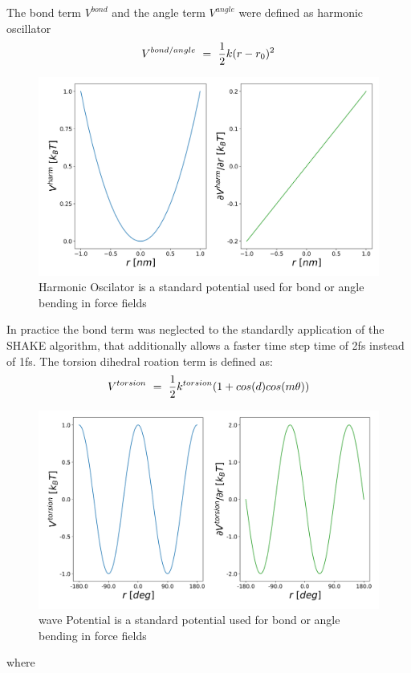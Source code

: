 The bond term  $V^{bond}$ and the angle term $V^{angle}$ were defined as harmonic oscillator \cite{}
\begin{equation}
    V^{bond/angle}~=~\frac{1}{2} k (r-r_0)^2 \\
\end{equation}
\begin{figure}[h]
    \centering
    \includegraphics[width=\textwidth]{fig/ForceField/harm_osc.png}
    \caption{Harmonic Oscilator is a standard potential used for bond or angle bending in force fields}
    \label{fig:harmOsc}
\end{figure}

In practice the bond term was neglected to the standardly application of the SHAKE algorithm, that additionally allows a faster time step time of 2fs instead of 1fs.
The torsion dihedral roation term is defined as: 
\begin{equation}
    V^{torsion}~=~\frac{1}{2} k^{torsion}(1+cos(d)cos(m\theta)) \\
\end{equation}
\begin{figure}[h]
    \centering
    \includegraphics[width=\textwidth]{fig/ForceField/torsion.png}
    \caption{wave Potential is a standard potential used for bond or angle bending in force fields}
    \label{fig:torsion}
\end{figure}
where 

